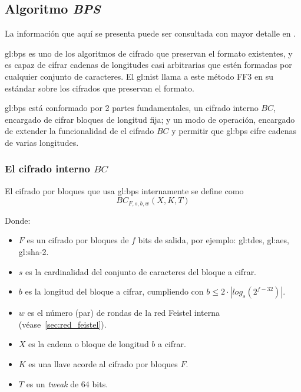 %
%

\subsection{Algoritmo \textit{BPS}}
\label{sec:bps}

La información que aquí se presenta puede ser consultada con mayor detalle en
\cite{bps}.

\Gls{gl:bps} es uno de los algoritmos de cifrado que preservan el formato
existentes, y es capaz de cifrar cadenas de longitudes casi arbitrarias que
estén formadas por cualquier conjunto de caracteres. El \gls{gl:nist} llama a
este método FF3 en su estándar sobre los cifrados que preservan el
formato\cite{nist_fpe}.

\Gls{gl:bps} está conformado por 2 partes fundamentales, un cifrado interno
$BC$, encargado de cifrar bloques de longitud fija; y un modo de operación,
encargado de extender la funcionalidad de el cifrado $BC$ y permitir que
\gls{gl:bps} cifre cadenas de varias longitudes.


\subsubsection{El cifrado interno $BC$}
\label{sec:bps_cifrador_interno_bc}


El cifrado por bloques que usa \gls{gl:bps} internamente se define como
\begin{equation}
  BC_{F,s,b,w}(X,K,T)
\end{equation}

Donde:
\begin{itemize}
  \item $F$ es un cifrado por bloques de $f$ bits de salida,
    por ejemplo: \gls{gl:tdes}, \gls{gl:aes}, \gls{gl:sha}-2.
  \item $s$ es la cardinalidad del conjunto de caracteres del bloque a cifrar.
  \item $b$ es la longitud del bloque a cifrar,
    cumpliendo con $b \leq 2 \cdot |log_s(2^{f-32})|$.
  \item $w$ es el número (par) de rondas de la red Feistel interna
    (véase~\ref{sec:red_feistel}).
  \item $X$ es la cadena o bloque de longitud $b$ a cifrar.
  \item $K$ es una llave acorde al cifrado por bloques $F$.
  \item $T$ es un \textit{tweak} de 64 bits.
\end{itemize}


